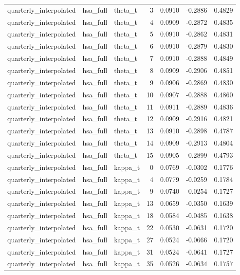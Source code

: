 \begin{tabular}{lllrrrr}
quarterly\_interpolated & hsa\_full & theta\_t & 3 & 0.0910 & -0.2886 & 0.4829 \\
quarterly\_interpolated & hsa\_full & theta\_t & 4 & 0.0909 & -0.2872 & 0.4835 \\
quarterly\_interpolated & hsa\_full & theta\_t & 5 & 0.0910 & -0.2862 & 0.4831 \\
quarterly\_interpolated & hsa\_full & theta\_t & 6 & 0.0910 & -0.2879 & 0.4830 \\
quarterly\_interpolated & hsa\_full & theta\_t & 7 & 0.0910 & -0.2888 & 0.4849 \\
quarterly\_interpolated & hsa\_full & theta\_t & 8 & 0.0909 & -0.2906 & 0.4851 \\
quarterly\_interpolated & hsa\_full & theta\_t & 9 & 0.0906 & -0.2869 & 0.4830 \\
quarterly\_interpolated & hsa\_full & theta\_t & 10 & 0.0907 & -0.2888 & 0.4860 \\
quarterly\_interpolated & hsa\_full & theta\_t & 11 & 0.0911 & -0.2889 & 0.4836 \\
quarterly\_interpolated & hsa\_full & theta\_t & 12 & 0.0909 & -0.2916 & 0.4821 \\
quarterly\_interpolated & hsa\_full & theta\_t & 13 & 0.0910 & -0.2898 & 0.4787 \\
quarterly\_interpolated & hsa\_full & theta\_t & 14 & 0.0909 & -0.2913 & 0.4804 \\
quarterly\_interpolated & hsa\_full & theta\_t & 15 & 0.0905 & -0.2899 & 0.4793 \\
quarterly\_interpolated & hsa\_full & kappa\_t & 0 & 0.0769 & -0.0302 & 0.1776 \\
quarterly\_interpolated & hsa\_full & kappa\_t & 4 & 0.0779 & -0.0259 & 0.1784 \\
quarterly\_interpolated & hsa\_full & kappa\_t & 9 & 0.0740 & -0.0254 & 0.1727 \\
quarterly\_interpolated & hsa\_full & kappa\_t & 13 & 0.0659 & -0.0350 & 0.1639 \\
quarterly\_interpolated & hsa\_full & kappa\_t & 18 & 0.0584 & -0.0485 & 0.1638 \\
quarterly\_interpolated & hsa\_full & kappa\_t & 22 & 0.0530 & -0.0631 & 0.1720 \\
quarterly\_interpolated & hsa\_full & kappa\_t & 27 & 0.0524 & -0.0666 & 0.1720 \\
quarterly\_interpolated & hsa\_full & kappa\_t & 31 & 0.0524 & -0.0641 & 0.1727 \\
quarterly\_interpolated & hsa\_full & kappa\_t & 35 & 0.0526 & -0.0634 & 0.1757 \\

\end{tabular}
